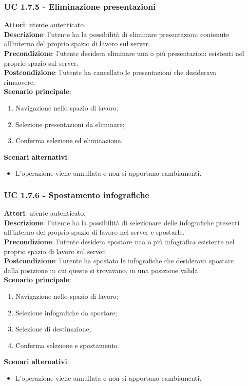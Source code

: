 	\subsubsection{UC 1.7.5 - Eliminazione presentazioni}{
		\label{uc1.7.5}
		\textbf{Attori}: utente autenticato.	\\
		\textbf{Descrizione}: l'utente ha la possibilità di eliminare presentazioni contenute all'interno del proprio spazio di lavoro sul server. \\
		\textbf{Precondizione}: l'utente desidera eliminare una o più presentazioni esistenti nel proprio spazio sul server.	\\
		\textbf{Postcondizione}: l'utente ha cancellato le presentazioni che desiderava rimuovere.	\\
		\textbf{Scenario principale}:
		\begin{enumerate}
			\item Navigazione nello spazio di lavoro;
			\item Selezione presentazioni da eliminare;
			\item Conferma selezione ed eliminazione.
		\end{enumerate}
		\textbf{Scenari alternativi}: 
		\begin{itemize}
			\item L'operazione viene annullata e non si apportano cambiamenti.
		\end{itemize}
		}
	\subsubsection{UC 1.7.6 - Spostamento infografiche}{
		\label{uc1.7.6}
		\textbf{Attori}: utente autenticato.	\\
		\textbf{Descrizione}: l'utente ha la possibilità di selezionare delle infografiche presenti all'interno del proprio spazio di lavoro nel server e spostarle. \\
		\textbf{Precondizione}: l'utente desidera spostare una o più infografica esistente nel proprio spazio di lavoro sul server.	\\
		\textbf{Postcondizione}: l'utente ha spostato le infografiche che desiderava spostare dalla posizione in cui queste si trovavano, in una posizione valida.	\\
		\textbf{Scenario principale}:
		\begin{enumerate}
			\item Navigazione nello spazio di lavoro;
			\item Selezione infografiche da spostare;
			\item Selezione di destinazione;
			\item Conferma selezione e spostamento.
		\end{enumerate}
		\textbf{Scenari alternativi}: 
		\begin{itemize}
			\item L'operazione viene annullata e non si apportano cambiamenti.
		\end{itemize}
		}

